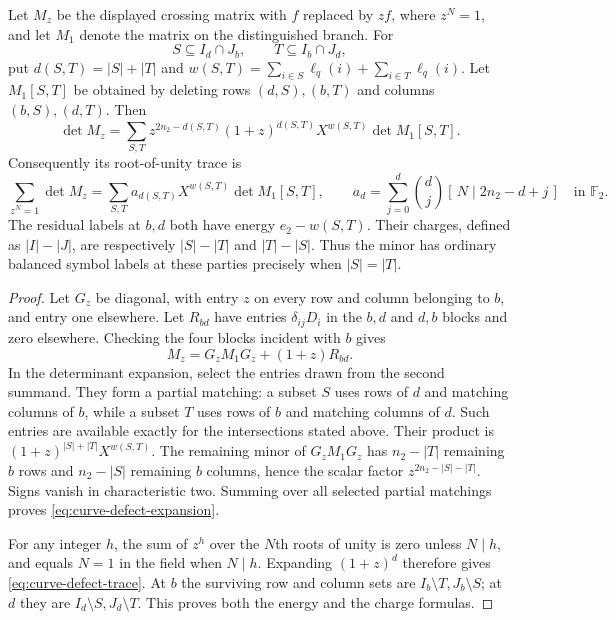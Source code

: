 \begin{proposition}\label{prop:curve-defects}
Let $M_z$ be the displayed crossing matrix with $f$ replaced by $zf$, where $z^N=1$, and let $M_1$ denote the matrix on the distinguished branch. For
\[
 S\subseteq I_d\cap J_b,\qquad T\subseteq I_b\cap J_d,
\]
put $d(S,T)=|S|+|T|$ and
$w(S,T)=\sum_{i\in S}\ell_q(i)+\sum_{i\in T}\ell_q(i)$.
Let $M_1[S,T]$ be obtained by deleting rows $(d,S),(b,T)$ and columns $(b,S),(d,T)$. Then
\begin{equation}\label{eq:curve-defect-expansion}
 \det M_z=\sum_{S,T}
 z^{2n_2-d(S,T)}(1+z)^{d(S,T)}
 X^{w(S,T)}\det M_1[S,T].
\end{equation}
Consequently its root-of-unity trace is
\begin{equation}\label{eq:curve-defect-trace}
 \sum_{z^N=1}\det M_z
 =\sum_{S,T}a_{d(S,T)}X^{w(S,T)}\det M_1[S,T],
 \qquad
 a_d=\sum_{j=0}^d\binom dj[\,N\mid2n_2-d+j\,]
 \quad\text{in }\mathbb F_2.
\end{equation}
The residual labels at $b,d$ both have energy $e_2-w(S,T)$. Their charges, defined as $|I|-|J|$, are respectively $|S|-|T|$ and $|T|-|S|$. Thus the minor has ordinary balanced symbol labels at these parties precisely when $|S|=|T|$.
\end{proposition}
\begin{proof}
Let $G_z$ be diagonal, with entry $z$ on every row and column belonging to $b$, and entry one elsewhere. Let $R_{bd}$ have entries $\delta_{ij}D_i$ in the $b,d$ and $d,b$ blocks and zero elsewhere. Checking the four blocks incident with $b$ gives
\[
 M_z=G_zM_1G_z+(1+z)R_{bd}.
\]
In the determinant expansion, select the entries drawn from the second summand. They form a partial matching: a subset $S$ uses rows of $d$ and matching columns of $b$, while a subset $T$ uses rows of $b$ and matching columns of $d$. Such entries are available exactly for the intersections stated above. Their product is $(1+z)^{|S|+|T|}X^{w(S,T)}$. The remaining minor of $G_zM_1G_z$ has $n_2-|T|$ remaining $b$ rows and $n_2-|S|$ remaining $b$ columns, hence the scalar factor $z^{2n_2-|S|-|T|}$. Signs vanish in characteristic two. Summing over all selected partial matchings proves \eqref{eq:curve-defect-expansion}.

For any integer $h$, the sum of $z^h$ over the $N$th roots of unity is zero unless $N\mid h$, and equals $N=1$ in the field when $N\mid h$. Expanding $(1+z)^d$ therefore gives \eqref{eq:curve-defect-trace}. At $b$ the surviving row and column sets are $I_b\setminus T,J_b\setminus S$; at $d$ they are $I_d\setminus S,J_d\setminus T$. This proves both the energy and the charge formulas.
\end{proof}

